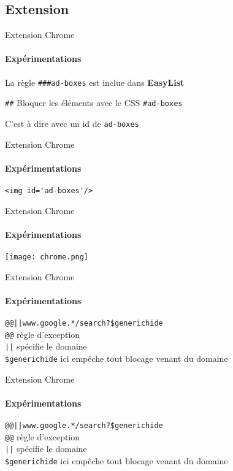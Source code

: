 \documentclass{beamer}
\begin{document}
	\subsection{Extension}
	
	\begin{frame}[fragile]{Extension Chrome}
		\framesubtitle{Expérimentations}
		\centering
		La règle \verb|###ad-boxes| est inclue dans \textbf{EasyList}\\
		\vspace{1em}
		
		\verb|##| \textrightarrow Bloquer les éléments avec le CSS \verb*|#ad-boxes|
		
		C'est à dire avec un id de \verb*|ad-boxes|
		
	\end{frame}
	
	\begin{frame}[fragile]{Extension Chrome}
		\framesubtitle{Expérimentations}
				
		\begin{lstlisting}
<img id='ad-boxes'/>
		\end{lstlisting}
	\end{frame}

	\begin{frame}[fragile]{Extension Chrome}
		\framesubtitle{Expérimentations}
		\texttt{[image: chrome.png]}
	\end{frame}

	\begin{frame}[fragile]{Extension Chrome}
		\framesubtitle{Expérimentations}
		\centering
		
		\texttt{@@||www.google.*/search?\$generichide}\\
		\vspace{1em} \color{lightgray}
		\texttt{@@} \textrightarrow règle d'exception\\
		\vspace{1em}
		\texttt{||} spécifie le domaine\\
		\vspace{1em}
		\texttt{\$generichide} ici empêche tout blocage venant du domaine 
	\end{frame}
	
	\begin{frame}[fragile]{Extension Chrome}
		\framesubtitle{Expérimentations}
		\centering
		
		\texttt{@@||www.google.*/search?\$generichide}\\
		\vspace{1em}
		\texttt{@@} \textrightarrow règle d'exception\\
		\vspace{1em}\color{lightgray}
		\texttt{||} spécifie le domaine\\
		\vspace{1em}
		\texttt{\$generichide} ici empêche tout blocage venant du domaine 
	\end{frame}
\end{document}
